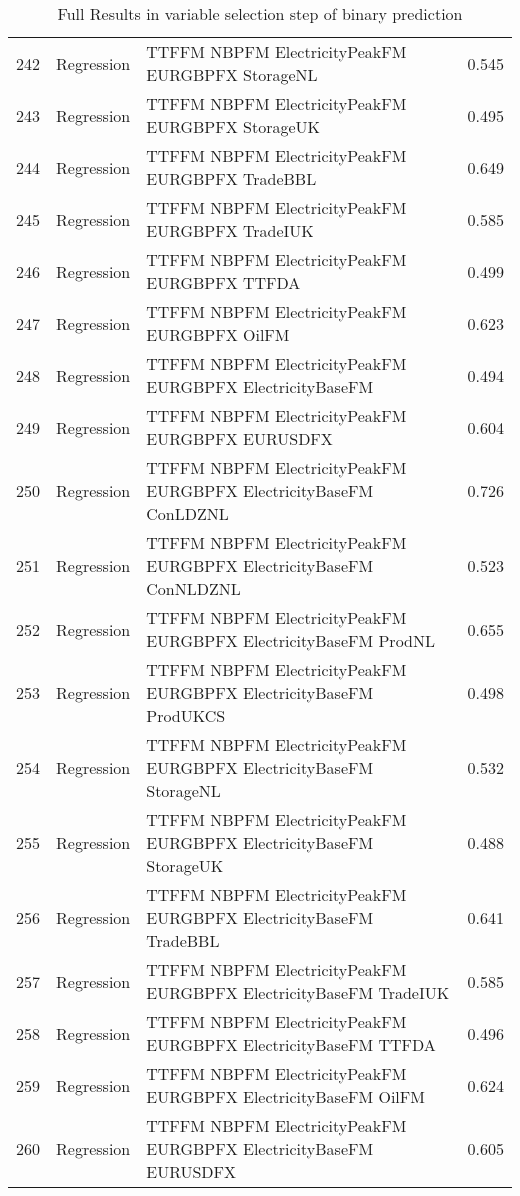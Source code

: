 \begin{table}[ht]
\begin{tabular}{rllr}
  242 & Regression & TTFFM NBPFM ElectricityPeakFM EURGBPFX StorageNL & 0.545 \\ 
  243 & Regression & TTFFM NBPFM ElectricityPeakFM EURGBPFX StorageUK & 0.495 \\ 
  244 & Regression & TTFFM NBPFM ElectricityPeakFM EURGBPFX TradeBBL & 0.649 \\ 
  245 & Regression & TTFFM NBPFM ElectricityPeakFM EURGBPFX TradeIUK & 0.585 \\ 
  246 & Regression & TTFFM NBPFM ElectricityPeakFM EURGBPFX TTFDA & 0.499 \\ 
  247 & Regression & TTFFM NBPFM ElectricityPeakFM EURGBPFX OilFM & 0.623 \\ 
  248 & Regression & TTFFM NBPFM ElectricityPeakFM EURGBPFX ElectricityBaseFM & 0.494 \\ 
  249 & Regression & TTFFM NBPFM ElectricityPeakFM EURGBPFX EURUSDFX & 0.604 \\ 
  250 & Regression & TTFFM NBPFM ElectricityPeakFM EURGBPFX ElectricityBaseFM ConLDZNL & 0.726 \\ 
  251 & Regression & TTFFM NBPFM ElectricityPeakFM EURGBPFX ElectricityBaseFM ConNLDZNL & 0.523 \\ 
  252 & Regression & TTFFM NBPFM ElectricityPeakFM EURGBPFX ElectricityBaseFM ProdNL & 0.655 \\ 
  253 & Regression & TTFFM NBPFM ElectricityPeakFM EURGBPFX ElectricityBaseFM ProdUKCS & 0.498 \\ 
  254 & Regression & TTFFM NBPFM ElectricityPeakFM EURGBPFX ElectricityBaseFM StorageNL & 0.532 \\ 
  255 & Regression & TTFFM NBPFM ElectricityPeakFM EURGBPFX ElectricityBaseFM StorageUK & 0.488 \\ 
  256 & Regression & TTFFM NBPFM ElectricityPeakFM EURGBPFX ElectricityBaseFM TradeBBL & 0.641 \\ 
  257 & Regression & TTFFM NBPFM ElectricityPeakFM EURGBPFX ElectricityBaseFM TradeIUK & 0.585 \\ 
  258 & Regression & TTFFM NBPFM ElectricityPeakFM EURGBPFX ElectricityBaseFM TTFDA & 0.496 \\ 
  259 & Regression & TTFFM NBPFM ElectricityPeakFM EURGBPFX ElectricityBaseFM OilFM & 0.624 \\ 
  260 & Regression & TTFFM NBPFM ElectricityPeakFM EURGBPFX ElectricityBaseFM EURUSDFX & 0.605 \\ 
   \hline
\end{tabular}
\caption{Full Results in variable selection step of binary prediction} 
\label{tab:binary.var.selection.full}
\end{table}
